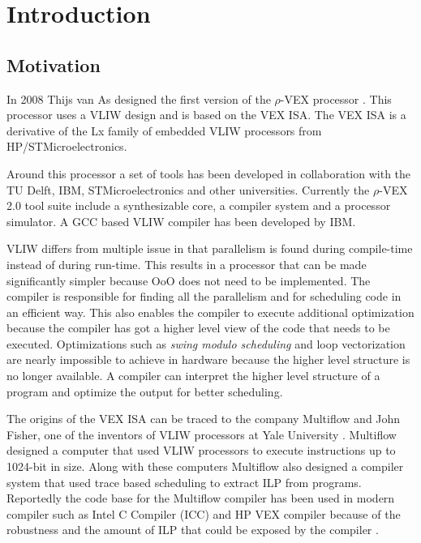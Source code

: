 \chapter{Introduction}
\label{chap:introduction}
\section{Motivation}

In 2008 Thijs van As designed the first version of the $\rho$-VEX processor \cite{As:2008rt}. This processor uses a VLIW design and is based on the VEX ISA. The VEX ISA is a derivative of the Lx family of embedded VLIW processors \cite{854391} from HP/STMicroelectronics.

Around this processor a set of tools has been developed in collaboration with the TU Delft, IBM, STMicroelectronics and other universities. Currently the $\rho$-VEX 2.0 tool suite include a synthesizable core, a compiler system and a processor simulator. A GCC based VLIW compiler has been developed by IBM. 

VLIW differs from multiple issue in that parallelism is found during compile-time instead of during run-time. This results in a processor that can be made significantly simpler because OoO does not need to be implemented. The compiler is responsible for finding all the parallelism and for scheduling code in an efficient way. This also enables the compiler to execute additional optimization because the compiler has got a higher level view of the code that needs to be executed. Optimizations such as \emph{swing modulo scheduling} and loop vectorization are nearly impossible to achieve in hardware because the higher level structure is no longer available. A compiler can interpret the higher level structure of a program and optimize the output for better scheduling. 

The origins of the VEX ISA can be traced to the company Multiflow and John Fisher, one of the inventors of VLIW processors at Yale University \cite{Fisher:1983:VLI:1067651.801649}. Multiflow designed a computer that used VLIW processors to execute instructions up to 1024-bit in size. Along with these computers Multiflow also designed a compiler system that used trace based scheduling to extract ILP from programs. Reportedly the code base for the Multiflow compiler has been used in modern compiler such as Intel C Compiler (ICC) and HP VEX compiler because of the robustness and the amount of ILP that could be exposed by the compiler \cite{Lowney:1993qy}.



